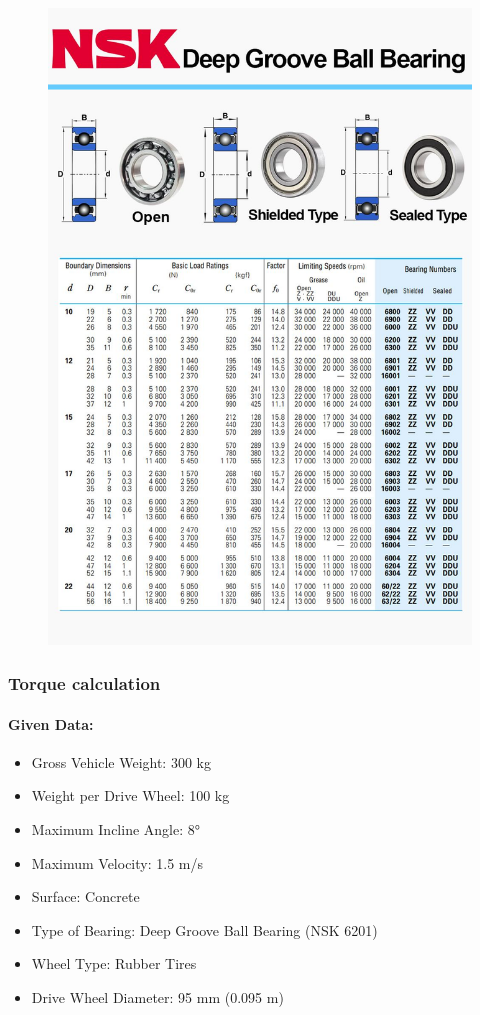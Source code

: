 \documentclass[../../main]{subfiles}
\begin{document}
\newpage
\begin{figure}[H]
\centering
\includegraphics[width=\textwidth]{img/img1.jpg}
\caption{}
\end{figure}
\newpage

\subsubsection{Torque calculation}

\paragraph{Given Data:}
\begin{itemize}
\item
  Gross Vehicle Weight: 300 kg
\item
  Weight per Drive Wheel: 100 kg
\item
  Maximum Incline Angle: 8°
\item
  Maximum Velocity: 1.5 m/s
\item
  Surface: Concrete
\item
  Type of Bearing: Deep Groove Ball Bearing (NSK 6201)
\item
  Wheel Type: Rubber Tires
\item
  Drive Wheel Diameter: 95 mm (0.095 m)
\end{itemize}
\end{document}
